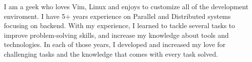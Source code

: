 

\begin{cvparagraph}

    I am a geek who loves Vim, Linux and enjoys to customize all of the
    development enviroment. I have 5+ years experience on Parallel and
    Distributed systems focusing on backend. With my experience, I learned to
    tackle several tasks to improve problem-solving skills, and increase my
    knowledge about tools and technologies. In each of those years, I developed
    and increased my love for challenging tasks and the knowledge that comes
    with every task solved.

\end{cvparagraph}
